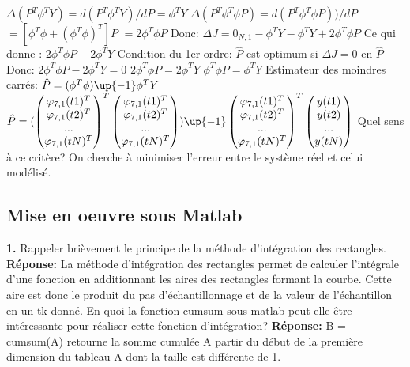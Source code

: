 \documentclass[12pt]{article}
\begin{document}
\smallbreak
$
\Delta (P^T \phi ^T Y) =d(P^T \phi ^T Y)/dP= \phi ^T Y
$
\smallbreak
$
\Delta (P^T \phi ^T \phi P) =d(P^T \phi ^T \phi P))/dP
$
\smallbreak
$
= [ \phi ^T \phi + (\phi ^T \phi)^T]P
$
\smallbreak
$
= 2 \phi ^T \phi P
$
\smallbreak
Donc: $ \Delta J = 0 _{N,1} - \phi ^T Y - \phi ^T Y + 2 \phi ^T \phi P$
\smallbreak
Ce qui donne : $2 \phi ^T \phi P - 2 \phi ^T Y$
\smallbreak
Condition du 1er ordre: $\hat{P}$ est optimum si $\Delta J=0$ en $\hat{P}$
\smallbreak
Donc: 
$2 \phi ^T \phi P - 2 \phi ^T Y =0$
\smallbreak
$2 \phi ^T \phi P  =2 \phi ^T Y$
\smallbreak
$ \phi ^T \phi P  = \phi ^T Y$
\smallbreak
Estimateur des moindres carrés: 
$\hat{P}=(\phi ^T \phi)\up{-1} \phi ^T Y$
\smallbreak
\begin{math}
\hat{P}=(
\begin{pmatrix}
\varphi _{7,1}(t1)^T\\
\varphi _{7,1}(t2)^T\\
... \\
\varphi _{7,1}(tN)^T
\end{pmatrix} ^T
\begin{pmatrix}
\varphi _{7,1}(t1)^T\\
\varphi _{7,1}(t2)^T\\
... \\
\varphi _{7,1}(tN)^T
\end{pmatrix})\up{-1} 
\begin{pmatrix}
\varphi _{7,1}(t1)^T\\
\varphi _{7,1}(t2)^T\\
... \\
\varphi _{7,1}(tN)^T
\end{pmatrix} ^T 
\begin{pmatrix}
y(t1)\\
y(t2)\\
... \\
y(tN)
\end{pmatrix}
\end{math}
\smallbreak
Quel sens à ce critère?
\smallbreak
On cherche à minimiser l'erreur entre le système réel et celui  modélisé.


\subsection{Mise en oeuvre sous Matlab}
\smallbreak
\textbf{1.} Rappeler brièvement le principe de la méthode d'intégration des rectangles.
\smallbreak
\textbf{Réponse:} 
\smallbreak
La méthode d'intégration des rectangles permet de calculer l'intégrale d'une fonction en additionnant les aires des rectangles formant la courbe.
Cette aire est donc le produit du pas d'échantillonnage et de  la valeur de l'échantillon en un tk donné.
\smallbreak
En quoi la fonction cumsum sous matlab peut-elle être intéressante pour réaliser cette fonction d'intégration?
\smallbreak
\textbf{Réponse: }
\smallbreak
 B = cumsum(A) retourne la somme cumulée A partir du début de la première dimension du tableau A dont la taille est différente de 1.
\end{document}
